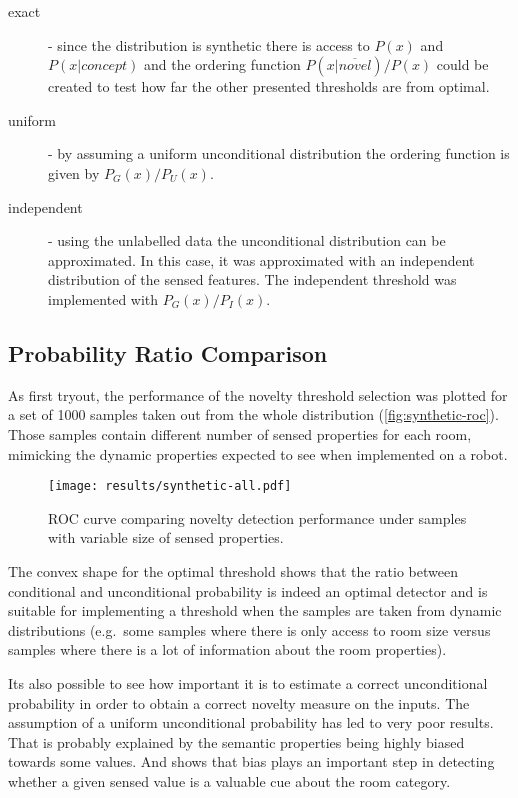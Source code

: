 \begin{description}
\item[exact] 
- since the distribution is synthetic there is access to $P(x)$ and $P(x|concept)$
and the ordering function $P(x|\overline{novel})/P(x)$ could be created
to test how far the other presented thresholds are from optimal.


\item[uniform]
- by assuming a uniform unconditional distribution the ordering function is
  given by $P_G(x)/P_U(x)$.

\item[independent]
- using the unlabelled data the unconditional distribution can be approximated.
  In this case, it was approximated with an independent distribution of the
  sensed features. The independent threshold was implemented with $P_G(x)/P_I(x)$.
\end{description}


\subsection{Probability Ratio Comparison}
As first tryout, the performance of the novelty threshold selection was plotted for a set
of 1000 samples taken out from the whole distribution (\autoref{fig:synthetic-roc}).
Those samples contain different number of sensed properties for each room, mimicking
the dynamic properties expected to see when implemented on a robot.

\begin{figure}[h]
\centering
\texttt{[image: results/synthetic-all.pdf]}

\caption{\label{fig:synthetic-roc}ROC curve comparing novelty detection performance
         under samples with variable size of sensed properties.}
\end{figure}

The convex shape for the optimal threshold shows that the ratio between conditional
and unconditional probability is indeed an optimal detector and is suitable for
implementing a threshold when the samples are taken from dynamic
distributions (e.g.\ some samples where there is only access to room size versus
samples where there is a lot of information about the room properties).

Its also possible to see how important it is to estimate a correct unconditional
probability in order to obtain a correct novelty measure on the inputs.
The assumption of a uniform unconditional probability has led to very poor results.
That is probably explained by the semantic properties being highly
biased towards some values. And shows that bias plays an important step
in detecting whether a given sensed value is a valuable cue about the room category.



